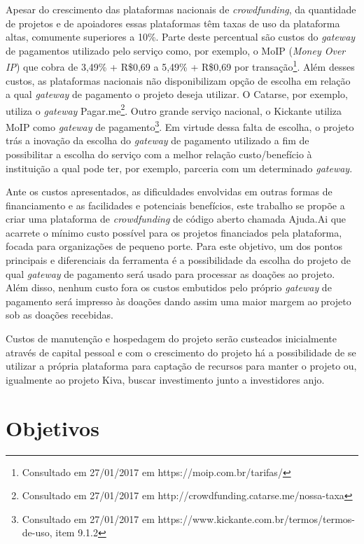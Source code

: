 Apesar do crescimento das plataformas nacionais de \emph{crowdfunding}, da quantidade de projetos e de apoiadores essas plataformas têm taxas de uso da plataforma altas, comumente superiores a 10\%. Parte deste percentual são custos do \emph{gateway} de pagamentos utilizado pelo serviço como, por exemplo, o MoIP (\emph{Money Over IP}) que cobra de 3,49\% + R\$0,69 a 5,49\% + R\$0,69 por transação\footnote{Consultado em 27/01/2017 em https://moip.com.br/tarifas/}. Além desses custos, as plataformas nacionais não disponibilizam opção de escolha em relação a qual \emph{gateway} de pagamento o projeto deseja utilizar. O Catarse, por exemplo, utiliza o \emph{gateway} Pagar.me\footnote{Consultado em 27/01/2017 em http://crowdfunding.catarse.me/nossa-taxa}. Outro grande serviço nacional, o Kickante utiliza MoIP como \emph{gateway} de pagamento\footnote{Consultado em 27/01/2017 em https://www.kickante.com.br/termos/termos-de-uso, item 9.1.2}. Em virtude dessa falta de escolha, o projeto trás a inovação da escolha do \emph{gateway} de pagamento utilizado a fim de possibilitar a escolha do serviço com a melhor relação custo/benefício à instituição a qual pode ter, por exemplo, parceria com um determinado \emph{gateway}.

Ante os custos apresentados, as dificuldades envolvidas em outras formas de financiamento e as facilidades e potenciais benefícios, este trabalho se propõe a criar uma plataforma de \emph{crowdfunding} de código aberto chamada Ajuda.Ai que acarrete o mínimo custo possível para os projetos financiados pela plataforma, focada para organizações de pequeno porte. Para este objetivo, um dos pontos principais e diferenciais da ferramenta é a possibilidade da escolha do projeto de qual \emph{gateway} de pagamento será usado para processar as doações ao projeto. Além disso, nenhum custo fora os custos embutidos pelo próprio \emph{gateway} de pagamento será impresso às doações dando assim uma maior margem ao projeto sob as doações recebidas.

Custos de manutenção e hospedagem do projeto serão custeados inicialmente através de capital pessoal e com o crescimento do projeto há a possibilidade de se utilizar a própria plataforma para captação de recursos para manter o projeto ou, igualmente ao projeto Kiva, buscar investimento junto a investidores anjo.



\section{Objetivos}

